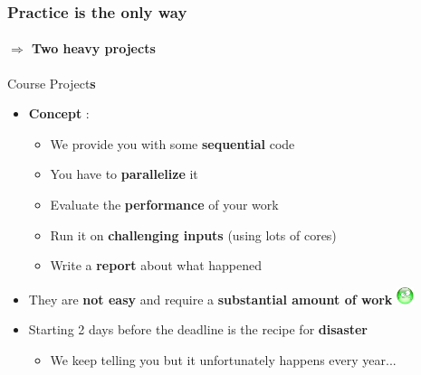 \documentclass[10pt]{beamer}
\begin{document}
\begin{frame}
  \frametitle{\textbf{Practice} is the only way}
  \framesubtitle{$\Rightarrow$ Two heavy projects }
  \begin{block}{Course Project\textbf{s}}
    \begin{itemize}
      
    \item \textbf{Concept} :
      \begin{itemize}
      \item We provide you with some \textbf{sequential} code
      \item You have to \textbf{parallelize} it
      \item Evaluate the \textbf{performance} of your work
      \item Run it on \textbf{challenging inputs} (using lots of cores)
      \item Write a \textbf{report} about what happened
      \end{itemize}
  
      \medskip

    \item They are \textbf{not easy} and require a \textbf{substantial amount of work} \includegraphics[width=0.5cm,trim=0 17mm 0 0]{triste}
      
      \medskip
      
    \item Starting 2 days before the deadline is the recipe for \textbf{disaster}
      \begin{itemize}
      \item We keep telling you but it unfortunately happens every year...
      \end{itemize}
    \end{itemize}
  \end{block} 
\end{frame}

\end{document}
